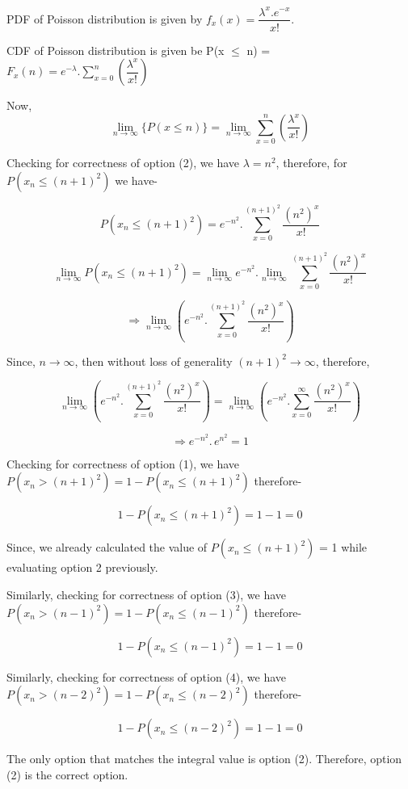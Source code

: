 \documentclass[12pt]{article}
\begin{document}
\noindent PDF of Poisson distribution is given by $f_x(x) = \dfrac{\lambda^x . e^{-x}}{x!}$.

\noindent CDF of Poisson distribution is given be P(x $\leq$ n) = $F_x(n) = e^{-\lambda}.\sum_{x=0}^n \left(\dfrac{\lambda^x}{x!} \right)$

\noindent Now,
$$
\lim_{n \to \infty} \{P(x \leq n)\} = \lim_{n \to \infty} \sum_{x=0}^n \left(\dfrac{\lambda^x}{x!} \right)
$$

\noindent Checking for correctness of option (2), we have $\lambda = n^2$, therefore, for $P(x_n \leq (n+1)^2)$ we have-

$$
P(x_n \leq (n+1)^2) = e^{-n^2}. \sum_{x=0}^{(n+1)^2} \dfrac{(n^2)^x}{x!}
$$

$$
\lim_{n \to \infty} P(x_n \leq (n+1)^2) = \lim_{n \to \infty} e^{-n^2} . \lim_{n \to \infty} \sum_{x=0}^{(n+1)^2} \dfrac{(n^2)^x}{x!}
$$

$$
\Rightarrow \lim_{n \to \infty} \left( e^{-n^2} . \sum_{x=0}^{(n+1)^2} \dfrac{(n^2)^x}{x!} \right)
$$

\noindent Since, $ n \to \infty$, then without loss of generality $(n+1)^2 \to \infty$, therefore, 

$$
\lim_{n \to \infty} \left( e^{-n^2} . \sum_{x=0}^{(n+1)^2} \dfrac{(n^2)^x}{x!} \right) = \lim_{n \to \infty} \left( e^{-n^2} . \sum_{x=0}^{\infty} \dfrac{(n^2)^x}{x!} \right)
$$

$$
\Rightarrow e^{-n^2} .\, e^{n^2} = 1
$$

\noindent Checking for correctness of option (1), we have $P(x_n > (n+1)^2) = 1 - P(x_n \leq (n+1)^2)$ therefore-

$$
1 - P(x_n \leq (n+1)^2) = 1 - 1 = 0
$$

\noindent Since, we already calculated the value of $P(x_n \leq (n+1)^2)$ = 1 while evaluating option 2 previously.

\noindent Similarly, checking for correctness of option (3), we have $P(x_n > (n-1)^2) = 1 - P(x_n \leq (n-1)^2)$ therefore-

$$
1 - P(x_n \leq (n-1)^2) = 1 - 1 = 0
$$

\noindent Similarly, checking for correctness of option (4), we have $P(x_n > (n-2)^2) = 1 - P(x_n \leq (n-2)^2)$ therefore-

$$
1 - P(x_n \leq (n-2)^2) = 1 - 1 = 0
$$

\noindent The only option that matches the integral value is option (2). Therefore, option (2) is the correct option.
\end{document}
